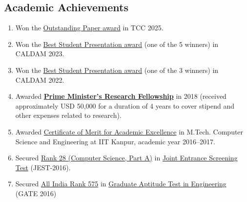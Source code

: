 \documentclass[margin]{res} %
\begin{document}
\begin{resume}

    


\section{Academic Achievements}

\begin{enumerate}
    \item Won the \href{https://www.linkedin.com/posts/cispa_congratulations-on-the-tcc-outstanding-ugcPost-7407070985310580737-7lt2?utm_source=share&utm_medium=member_desktop&rcm=ACoAACTz6fQBs27BwJxjG_fen9iqLzLlrNMFprs}{Outstanding Paper award} in TCC 2025.
    
    \item Won the \href{http://acsdm.in/acsdm/awards/}{Best Student Presentation award} (one of the 5 winners) in CALDAM 2023.
    
    \item Won the \href{http://acsdm.in/acsdm/awards/}{Best Student Presentation award} (one of the 3 winners) in CALDAM 2022.

    \item Awarded \href{https://pmrf.in}{\textbf{Prime Minister’s Research Fellowship}} in 2018 (received approximately USD 50,000 for a duration of 4 years to cover stipend and other expenses related to research).
    
    \item Awarded \href{https://mahe94.github.io/assets/pdf/excellence_certificate.pdf}{Certificate of Merit for Academic Excellence} in M.Tech. Computer Science and Engineering at IIT Kanpur, academic year 2016--2017.
    
    \item Secured \href{https://mahe94.github.io/assets/pdf/jest.pdf}{Rank 28 (Computer Science, Part A)} in \href{https://en.wikipedia.org/wiki/Joint_Entrance_Screening_Test}{Joint Entrance Screening Test} (JEST-2016).
    
    \item Secured \href{https://mahe94.github.io/assets/pdf/gate.pdf}{All India Rank 575} in \href{https://en.wikipedia.org/wiki/Graduate_Aptitude_Test_in_Engineering}{Graduate Aptitude Test in Engineering} (GATE 2016)
    

\end{enumerate}
\end{resume}
\end{document}
